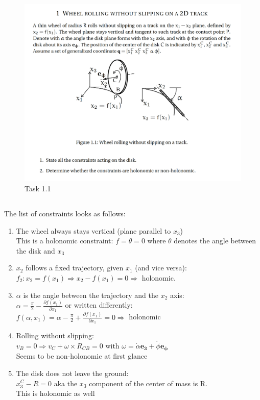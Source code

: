 \begin{figure}[ht]
    \centering
    \includegraphics[scale=0.4]{images/1.1.png}
    \caption{Task 1.1}
    \label{fig:task1.1}
\end{figure}
\clearpage

\subsection{}
The list of constraints looks as follows:

\begin{enumerate}
    \item The wheel always stays vertical (plane parallel to $x_3$)\\
        This is a holonomic constraint: $f = \theta = 0$ where $\theta$ denotes the angle between the disk and $x_3$
    \item $x_2$ follows a fixed trajectory, given $x_1$ (and vice versa):\\
        $f_2: x_2 = f(x_1) \Rightarrow x_2 - f(x_1) = 0 \Rightarrow$ holonomic.
    \item $\alpha$ is the angle between the trajectory and the $x_2$ axis:\\
        $\alpha = \frac{\pi}{2} - \frac{\partial f(x_1)}{\partial x_1}$ or written differently:\\
             $f(\alpha, x_1) = \alpha - \frac{\pi}{2} + \frac{\partial f(x_1)}{\partial x_1} = 0 \Rightarrow$ holonomic
    \item Rolling without slipping:\\
        $v_B = 0 \Rightarrow v_C + \omega \times R_{CB} = 0$ with $\omega = \dot{\alpha}\boldsymbol{e_3} + \dot\phi\boldsymbol{e_\phi}$\\
        Seems to be non-holonomic at first glance
    \item The disk does not leave the ground:\\
        $x_3^C - R = 0$ aka the $x_3$ component of the center of mass is R.\\
        This is holonomic as well
\end{enumerate}

